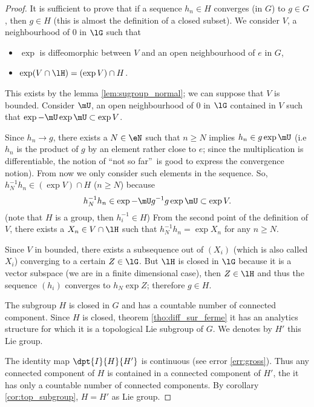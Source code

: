 \begin{proof}
 It is sufficient to prove that if a sequence $h_n\in H$ converges (in $G$) to $g\in G$, then $g\in H$ (this is almost the definition of a closed subset). We consider $V$, a neighbourhood of $0$ in $\lG$ such that 

\begin{itemize}
\item $\exp$ is diffeomorphic between $V$ and an open neighbourhood  of $e$ in $G$,
\item $\exp(V\cap \lH)=(\exp V)\cap H$.
\end{itemize}
This exists by the lemma \ref{lem:sugroup_normal}; we can suppose that $V$ is bounded. Consider $\mU$, an open neighbourhood of $0$ in $\lG$ contained in $V$ such that $\exp-\mU\exp\mU\subset\exp V$.

Since $h_n\to g$, there exists a $N\in\eN$ such that $n\geq N$ implies $h_n\in g\exp\mU$ (i.e $h_n$ is the product of $g$ by an element rather close to $e$; since the multiplication is differentiable, the notion of ``not so far''\ is good to express the convergence notion). From now we only consider such elements in the sequence. So, $h_N^{-1} h_n\in(\exp V)\cap H$ ($n\geq N$) because
\[
   h_N^{-1} h_n\in\exp-\mU g^{-1} g\exp\mU\subset\exp V.
\]
(note that $H$ is a group, then $h_i^{-1}\in H$) From the second point of the definition of $V$, there exists a $X_n\in V\cap\lH$ such that $h^{-1}_N h_n=\exp X_n$ for any $n\geq N$.

Since $V$ in bounded, there exists a subsequence out of $(X_i)$ (which is also called $X_i$) converging to a certain $Z\in\lG$. But $\lH$ is closed in $\lG$ because it is a vector subspace (we are in a finite dimensional case), then $Z\in\lH$ and thus the sequence $(h_i)$ converges to $h_N\exp Z$; therefore $g\in H$.

 The subgroup $H$ is closed in $G$ and has a countable number of connected component. Since $H$ is closed, theorem \ref{tho:diff_sur_ferme} it has an analytics structure for which it is a topological Lie subgroup of $G$. We denotes by $H'$ this Lie group.

The identity map $\dpt{I}{H}{H'}$ is continuous (see error \ref{err:gross}). Thus any connected component of $H$ is contained in a connected component of $H'$, the it has only a countable number of connected components. By corollary \ref{cor:top_subgroup}, $H=H'$ as Lie group.

\end{proof}


